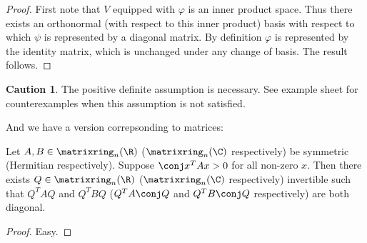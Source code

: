 \documentclass[a4paper]{article}
\newcommand*{\M}{\matrixring}
\theoremstyle{definition}
\newtheorem*{caution}{Caution}
\begin{document}
\begin{proof}
  First note that \(V\) equipped with \(\varphi\) is an inner product space. Thus there exists an orthonormal (with respect to this inner product) basis with respect to which \(\psi\) is represented by a diagonal matrix. By definition \(\varphi\) is represented by the identity matrix, which is unchanged under any change of basis. The result follows.
\end{proof}

\begin{caution}
  The positive definite assumption is necessary. See example sheet for counterexamples when this assumption is not satisfied.
\end{caution}

And we have a version correpsonding to matrices:

\begin{corollary}
  Let \(A, B \in \M_n(\R)\) (\(\M_n(\C)\) respectively) be symmetric (Hermitian respectively). Suppose \(\conj x^T Ax > 0\) for all non-zero \(x\). Then there exists \(Q \in \M_n(\R)\) (\(\M_n(\C)\) respectively) invertible such that \(Q^TAQ\) and \(Q^TBQ\) (\(Q^TA\conj Q\) and \(Q^TB\conj Q\) respectively) are both diagonal.
\end{corollary}

\begin{proof}
  Easy.
\end{proof}

\printindex
\end{document}
